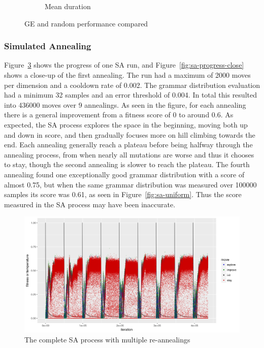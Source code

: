 \begin{figure}
\begin{subfigure}{0.4\textwidth}
        \caption{Mean duration}
        \label{fig:ge-random-duration}
    \end{subfigure}
    \caption{GE and random performance compared}
\end{figure}

\subsubsection{Simulated Annealing}

Figure~\ref{fig:sa-progress} shows the progress of one SA run, and Figure~\ref{fig:sa-progress-close} shows a close-up of the first annealing.
The run had a maximum of 2000 moves per dimension and a cooldown rate of 0.002.
The grammar distribution evaluation had a minimum 32 samples and an error threshold of 0.004.
In total this resulted into 436000 moves over 9 annealings.
As seen in the figure, for each annealing there is a general improvement from a fitness score of 0 to around 0.6.
As expected, the SA process explores the space in the beginning, moving both up and down in score, and then gradually focuses more on hill climbing towards the end.
Each annealing generally reach a plateau before being halfway through the annealing process, from when nearly all mutations are worse and thus it chooses to stay, though the second annealing is slower to reach the plateau.
The fourth annealing found one exceptionally good grammar distribution with a score of almost 0.75, but when the same grammar distribution was measured over 100000 samples its score was 0.61, as seen in Figure~\ref{fig:sa-uniform}.
Thus the score measured in the SA process may have been inaccurate.

\begin{figure}
    \includegraphics[width=\textwidth]{figures/sa-progress}
    \caption{The complete SA process with multiple re-annealings}
    \label{fig:sa-progress}
\end{figure}

